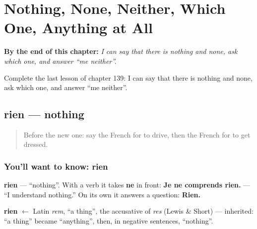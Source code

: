 
\chapter{Nothing, None, Neither, Which One, Anything at All}
\label{ch:fr-nothing-none-neither-which-one-anything-at-all}

\begin{chapteropening}
\textbf{By the end of this chapter:} \emph{I can say that there is nothing and none, ask which one, and answer \textquotedblleft{}me neither\textquotedblright{}.}

Complete the last lesson of chapter 139: I can say that there is nothing and none, ask which one, and answer \textquotedblleft{}me neither\textquotedblright{}.
\end{chapteropening}

\section[rien]{rien — nothing}

\label{lesson:FR-C139-rien}



\begin{quote}
Before the new one: say the French for to drive, then the French for to get dressed.
\end{quote}

\subsection*{You'll want to know: rien}
\textbf{rien} — \textquotedblleft{}nothing\textquotedblright{}. With a verb it takes \textbf{ne} in front: \textbf{Je ne comprends rien.} — \textquotedblleft{}I understand nothing.\textquotedblright{} On its own it answers a question: \textbf{Rien.}

\begin{cousinweb}
\textbf{rien} $\leftarrow$ Latin \emph{rem}, \textquotedblleft{}a thing\textquotedblright{}, the accusative of \emph{res} (Lewis \& Short) — inherited: \textquotedblleft{}a thing\textquotedblright{} became \textquotedblleft{}anything\textquotedblright{}, then, in negative sentences, \textquotedblleft{}nothing\textquotedblright{}.
\end{cousinweb}

